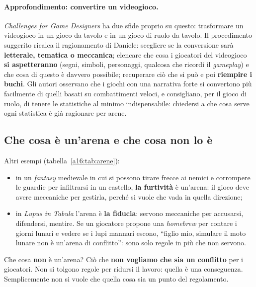 \paragraph{Approfondimento: convertire un videogioco.} \emph{Challenges for Game Designers} ha due
sfide proprio su questo: trasformare un videogioco in un gioco da tavolo e in un gioco di ruolo da
tavolo. Il procedimento suggerito ricalca il ragionamento di Daniele: scegliere se la conversione
sarà \textbf{letterale, tematica o meccanica}; elencare che cosa i giocatori del videogioco
\textbf{si aspetteranno} (segni, simboli, personaggi, qualcosa che ricordi il \emph{gameplay}) e
che cosa di questo è davvero possibile; recuperare ciò che si può e poi \textbf{riempire i buchi}.
Gli autori osservano che i giochi con una narrativa forte si convertono più facilmente di quelli
basati su combattimenti veloci, e consigliano, per il gioco di ruolo, di tenere le statistiche al
minimo indispensabile: chiedersi a che cosa serve ogni statistica è già ragionare per arene.

\subsection{Che cosa è un'arena e che cosa non lo è}



Altri esempi (tabella~\ref{a16:tab:arene}):
\begin{itemize}
  \item in un \emph{fantasy} medievale in cui si possono tirare frecce ai nemici e corrompere le
        guardie per infiltrarsi in un castello, \textbf{la furtività} è un'arena: il gioco deve
        avere meccaniche per gestirla, perché si vuole che vada in quella direzione;
  \item in \emph{Lupus in Tabula} l'arena è \textbf{la fiducia}: servono meccaniche per
        accusarsi, difendersi, mentire. Se un giocatore propone una \emph{homebrew} per contare i
        giorni lunari e vedere se i lupi mannari escono, ``figlio mio, simulare il moto lunare non
        è un'arena di conflitto'': sono solo regole in più che non servono.
\end{itemize}
Che cosa \textbf{non} è un'arena? Ciò che \textbf{non vogliamo che sia un conflitto} per i
giocatori. Non si tolgono regole per ridursi il lavoro: quella è una conseguenza. Semplicemente non
si vuole che quella cosa sia un punto del regolamento.

